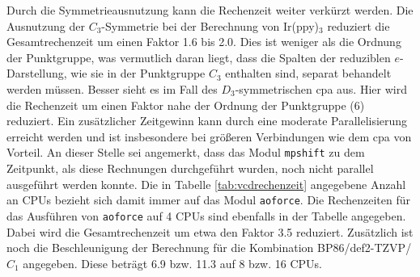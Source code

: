 \FloatBarrier
Durch die Symmetrieausnutzung kann die Rechenzeit weiter verkürzt werden. Die Ausnutzung der $C_3$-Symmetrie bei der Berechnung von Ir(ppy)$_3$ reduziert die Gesamtrechenzeit um einen Faktor 1.6 bis 2.0. Dies ist weniger als die Ordnung der Punktgruppe, was vermutlich daran liegt, dass die Spalten der reduziblen $e$-Darstellung, wie sie in der Punktgruppe $C_3$ enthalten sind, separat behandelt werden müssen. Besser sieht es im Fall des $D_3$-symmetrischen \ac{cpa} aus. Hier wird die Rechenzeit um einen Faktor nahe der Ordnung der Punktgruppe (6) reduziert. Ein zusätzlicher Zeitgewinn kann durch eine moderate Parallelisierung erreicht werden und ist insbesondere bei größeren Verbindungen wie dem \ac{cpa} von Vorteil. An dieser Stelle sei angemerkt, dass das Modul \texttt{mpshift} zu dem Zeitpunkt, als diese Rechnungen durchgeführt wurden, noch nicht parallel ausgeführt werden konnte. Die in Tabelle \ref{tab:vcdrechenzeit} angegebene Anzahl an CPUs bezieht sich damit immer auf das Modul \texttt{aoforce}. Die Rechenzeiten für das Ausführen von \texttt{aoforce} auf 4 CPUs sind ebenfalls in der Tabelle angegeben. Dabei wird die Gesamtrechenzeit um etwa den Faktor 3.5 reduziert. Zusätzlich ist noch die Beschleunigung der Berechnung für die Kombination BP86/def2-TZVP/$C_1$ angegeben. Diese beträgt 6.9 bzw. 11.3 auf 8 bzw. 16 CPUs.



